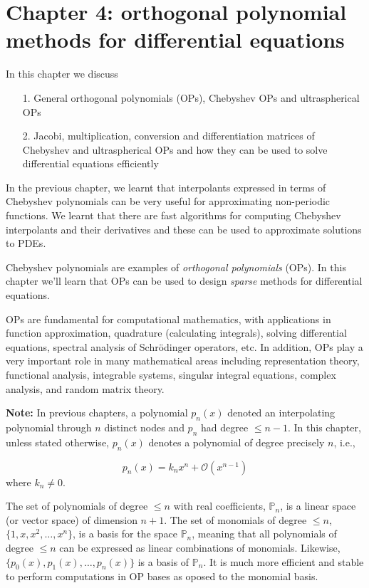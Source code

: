 \documentclass[12pt,a4paper]{article}
\begin{document}
\section{Chapter 4: orthogonal polynomial methods for differential equations}
In this chapter we discuss

\begin{itemize}
\item[1. ] General orthogonal polynomials (OPs), Chebyshev OPs and ultraspherical OPs


\item[2. ] Jacobi, multiplication, conversion and differentiation matrices of Chebyshev and ultraspherical OPs and how they can be used to solve differential equations efficiently

\end{itemize}
In the previous chapter, we learnt that interpolants expressed in terms of Chebyshev polynomials can be very useful for approximating non-periodic functions.  We learnt that there are fast algorithms for computing Chebyshev interpolants and their derivatives and these can be used to approximate solutions to PDEs.

Chebyshev polynomials are examples of \emph{orthogonal polynomials} (OPs).  In this chapter we'll learn that OPs can be used to design \emph{sparse} methods for differential equations.

OPs are fundamental for computational mathematics, with applications in function approximation, quadrature (calculating integrals), solving differential equations, spectral analysis of Schrödinger operators, etc.  In addition, OPs play a very important role in many mathematical areas including representation theory, functional analysis, integrable systems, singular integral equations, complex analysis, and random matrix theory.

\textbf{Note:} In previous chapters, a polynomial $p_n(x)$ denoted an interpolating polynomial through $n$ distinct nodes and $p_n$ had degree $\leq n-1$.  In this chapter, unless stated otherwise, $p_n(x)$ denotes a polynomial of degree precisely $n$, i.e., 

\[
p_n(x) = k_n x^n + \mathcal{O}(x^{n-1})
\]
where $k_n \neq 0$.

The set of polynomials of degree $\leq n$ with real coefficients, $\mathbb{P}_n$, is a linear space (or vector space) of dimension $n+1$.  The set of  monomials of degree $\leq n$, $\lbrace 1, x, x^2, \ldots, x^n \rbrace$, is a basis for the space $\mathbb{P}_n$, meaning that all polynomials of degree $\leq n$ can be expressed as linear combinations of monomials.  Likewise, $\lbrace p_0(x), p_1(x), \ldots, p_n(x) \rbrace$ is a basis of $\mathbb{P}_n$.  It is much  more efficient and stable to perform computations in OP bases as oposed to the monomial basis.
\end{document}
